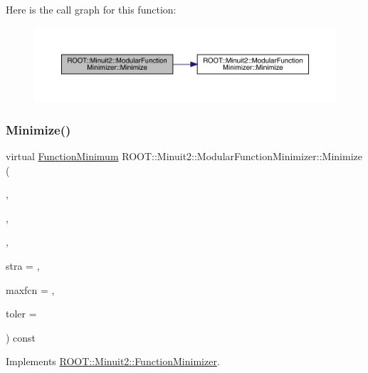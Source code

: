 Here is the call graph for this function\+:
\nopagebreak
\begin{figure}[H]
\begin{center}
\leavevmode
\includegraphics[width=350pt]{d3/dc8/classROOT_1_1Minuit2_1_1ModularFunctionMinimizer_a8a71d388729f9e81c3c031a2962f4d99_cgraph}
\end{center}
\end{figure}
\mbox{\label{classROOT_1_1Minuit2_1_1ModularFunctionMinimizer_a8354ed4403dda68040ea4d1b174835c1}} 
\subsubsection{\texorpdfstring{Minimize()}{Minimize()}\hspace{0.1cm}{\footnotesize\ttfamily [5/33]}}
{\footnotesize\ttfamily virtual \mbox{\hyperlink{classROOT_1_1Minuit2_1_1FunctionMinimum}{Function\+Minimum}} R\+O\+O\+T\+::\+Minuit2\+::\+Modular\+Function\+Minimizer\+::\+Minimize (\begin{DoxyParamCaption}\item[{const \mbox{\hyperlink{classROOT_1_1Minuit2_1_1FCNGradientBase}{F\+C\+N\+Gradient\+Base}} \&}]{,  }\item[{const std\+::vector$<$ double $>$ \&}]{,  }\item[{const std\+::vector$<$ double $>$ \&}]{,  }\item[{unsigned int}]{stra = {},  }\item[{unsigned int}]{maxfcn = {},  }\item[{double}]{toler = {} }\end{DoxyParamCaption}) const\hspace{0.3cm}{\ttfamily [virtual]}}



Implements \mbox{\hyperlink{classROOT_1_1Minuit2_1_1FunctionMinimizer_ac6063af1cb58f0fd75b16d3cebc49f54}{R\+O\+O\+T\+::\+Minuit2\+::\+Function\+Minimizer}}.



